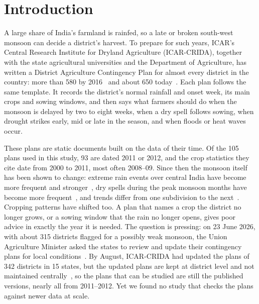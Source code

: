 
\section{Introduction}
\label{sec:intro}

A large share of India's farmland is rainfed, so a late or broken south-west
monsoon can decide a district's harvest. To prepare for such years, ICAR's Central Research
Institute for Dryland Agriculture (ICAR-CRIDA), together with the state agricultural
universities and the Department of Agriculture, has written a District Agriculture
Contingency Plan for almost every district in the country: more than 580 by
2016~\cite{rao2016realtime} and about 650 today~\cite{crida_plans}. Each plan follows
the same template. It records the district's normal rainfall and onset week, its main
crops and sowing windows, and then says what farmers should do when the monsoon is
delayed by two to eight weeks, when a dry spell follows sowing, when drought strikes
early, mid or late in the season, and when floods or heat waves occur.

These plans are static documents built on the data of their time. Of the 105 plans
used in this study, 93 are dated 2011 or 2012, and the crop statistics they cite date
from 2000 to 2011, most often 2008--09. Since then the monsoon itself has been shown to change:
extreme rain events over central India have become more frequent and
stronger~\cite{goswami2006extreme,roxy2017threefold}, dry spells during the peak
monsoon months have become more frequent~\cite{singh2014spells}, and trends differ
from one subdivision to the next~\cite{guhathakurta2008trends}. Cropping patterns have
shifted too. A plan that names a crop the district no longer grows, or a sowing window
that the rain no longer opens, gives poor advice in exactly the year it is needed. The
question is pressing: on 23 June 2026, with about 315 districts flagged for a possibly
weak monsoon, the Union Agriculture Minister asked the states to review and update
their contingency plans for local conditions~\cite{pib2026kharif}. By August, ICAR-CRIDA
had updated the plans of 342 districts in 15 states, but the updated plans are kept at
district level and not maintained centrally~\cite{loksabha2026dacp}, so the plans that can
be studied are still the published versions, nearly all from 2011--2012. Yet we found no study that checks
the plans against newer data at scale.

